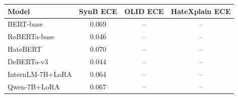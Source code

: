 \begin{tabular}{lccc}
\toprule
Model & SynB ECE & OLID ECE & HateXplain ECE \\
\midrule
BERT-base & 0.069 & -- & -- \\
RoBERTa-base & 0.046 & -- & -- \\
HateBERT & 0.070 & -- & -- \\
DeBERTa-v3 & 0.044 & -- & -- \\
InternLM-7B+LoRA & 0.064 & -- & -- \\
Qwen-7B+LoRA & 0.067 & -- & -- \\
\bottomrule
\end{tabular}
